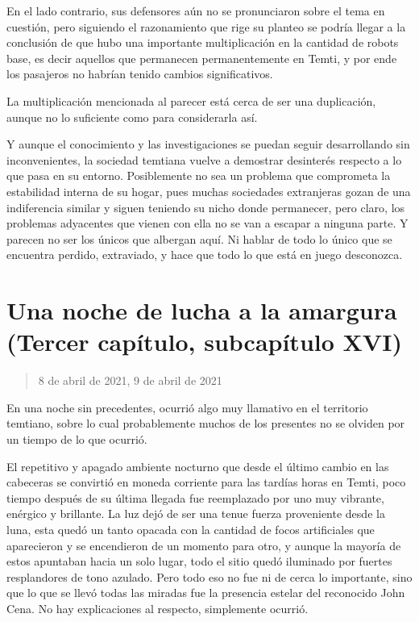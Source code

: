 \documentclass[
  spanish,
]{book}
\begin{document}
En el lado contrario, sus defensores aún no se pronunciaron sobre el tema en cuestión, pero siguiendo el razonamiento que rige su planteo se podría llegar a la conclusión de que hubo una importante multiplicación en la cantidad de robots base, es decir aquellos que permanecen permanentemente en Temti, y por ende los pasajeros no habrían tenido cambios significativos.

La multiplicación mencionada al parecer está cerca de ser una duplicación, aunque no lo suficiente como para considerarla así.

Y aunque el conocimiento y las investigaciones se puedan seguir desarrollando sin inconvenientes, la sociedad temtiana vuelve a demostrar desinterés respecto a lo que pasa en su entorno. Posiblemente no sea un problema que comprometa la estabilidad interna de su hogar, pues muchas sociedades extranjeras gozan de una indiferencia similar y siguen teniendo su nicho donde permanecer, pero claro, los problemas adyacentes que vienen con ella no se van a escapar a ninguna parte. Y parecen no ser los únicos que albergan aquí. Ni hablar de todo lo único que se encuentra perdido, extraviado, y hace que todo lo que está en juego desconozca.

\hypertarget{una-noche-de-lucha-a-la-amargura-tercer-capuxedtulo-subcapuxedtulo-xvi}{%
\section{Una noche de lucha a la amargura (Tercer capítulo, subcapítulo XVI)}\label{una-noche-de-lucha-a-la-amargura-tercer-capuxedtulo-subcapuxedtulo-xvi}}

\begin{quote}
8 de abril de 2021, 9 de abril de 2021
\end{quote}

En una noche sin precedentes, ocurrió algo muy llamativo en el territorio temtiano, sobre lo cual probablemente muchos de los presentes no se olviden por un tiempo de lo que ocurrió.

El repetitivo y apagado ambiente nocturno que desde el último cambio en las cabeceras se convirtió en moneda corriente para las tardías horas en Temti, poco tiempo después de su última llegada fue reemplazado por uno muy vibrante, enérgico y brillante. La luz dejó de ser una tenue fuerza proveniente desde la luna, esta quedó un tanto opacada con la cantidad de focos artificiales que aparecieron y se encendieron de un momento para otro, y aunque la mayoría de estos apuntaban hacia un solo lugar, todo el sitio quedó iluminado por fuertes resplandores de tono azulado. Pero todo eso no fue ni de cerca lo importante, sino que lo que se llevó todas las miradas fue la presencia estelar del reconocido John Cena. No hay explicaciones al respecto, simplemente ocurrió.
\end{document}
